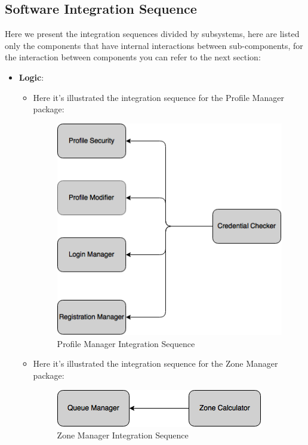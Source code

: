 \documentclass[../../../../../../testPlan.tex]{subfiles}
\begin{document}
	\subsection{Software Integration Sequence}
		Here we present the integration sequences divided by subsystems, here are listed only the components that have internal interactions between sub-components, for the interaction between components you can refer to the next section:
		\begin{itemize}

			\item \textbf{Logic}:
					\begin{itemize}
						\item Here it's illustrated the integration sequence for the Profile Manager package:
							\begin{figure}[H]
								\centering
								\includegraphics[width=\textwidth, scale=0.5]{../images/priority_profileManager.png}
							\caption{Profile Manager Integration Sequence}\label{fig:ProfileManagerSequence}
							\end{figure}

						\item Here it's illustrated the integration sequence for the Zone Manager package:
							\begin{figure}[H]
								\centering
								\includegraphics[width=\textwidth, scale=0.5]{../images/priority_zoneManager.png}
								\caption{Zone Manager Integration Sequence}\label{fig:ZoneManagerSequence}
							\end{figure}
					\end{itemize}


\end{itemize}
\end{document}
